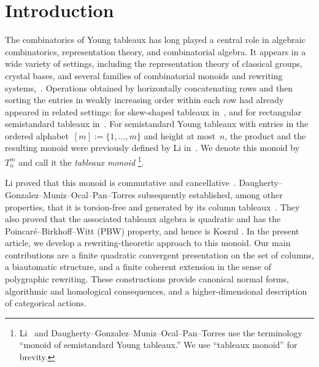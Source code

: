 \documentclass[a4paper, twoside, 11pt, english]{article}
\theoremstyle{plain}
\theoremstyle{definition}
\begin{document}
\vspace{0.5cm} 





\section{Introduction}
\label{S:Introduction}

The combinatorics of Young tableaux has long played a central role in algebraic combinatorics, representation theory, and combinatorial algebra. It appears in a wide variety of settings, including the representation theory of classical groups, crystal bases, and several families of combinatorial monoids and rewriting systems,~\cite{Fulton97,CainGrayMalheiro15,CainGrayMalheiro19,Hage25,Hage2021Super,Hage15,HageMalbos22,HageMalbos17,Hage2022RSK, Hage26}.
Operations obtained by horizontally concatenating rows and then sorting the entries in weakly increasing order within each row had already appeared in related settings: for skew-shaped tableaux in~\cite{Per2016}, and for rectangular
semistandard tableaux in~\cite{ChangDuanFraserLi20}. For semistandard Young tableaux with entries in the ordered
alphabet~$[m]:=\{1,\ldots,m\}$ and height at most~$n$, the product and the resulting monoid were previously defined by Li in~\cite[Section~3]{LiDualCanonical26}. We denote this monoid by~$T_n^m$ and call it the \emph{tableaux monoid}
\footnote{Li~\cite{LiDualCanonical26} and
Daugherty--Gonzalez--Muniz--Ocal--Pan--Torres
\cite{DaughertyGonzalezMunizOcalPanTorres25} use the terminology
``monoid of semistandard Young tableaux.'' We use ``tableaux monoid''
for brevity.}.


Li proved that this monoid is commutative and cancellative~\cite[Lemma~3.2]{LiDualCanonical26}.
Daugherty--Gonzalez--Muniz--Ocal--Pan--Torres subsequently established,
among other properties, that it is torsion-free and generated by its column
tableaux~\cite[Proposition~2.2]
{DaughertyGonzalezMunizOcalPanTorres25}.
They also proved that the associated tableaux algebra is quadratic and has
the Poincar\'e--Birkhoff--Witt (PBW) property, and hence is Koszul
\cite[Theorem~2.13, Corollary~2.14]
{DaughertyGonzalezMunizOcalPanTorres25}.
In the present article, we develop a rewriting-theoretic approach to this
monoid. Our main contributions are a finite quadratic convergent presentation
on the set of columns, a biautomatic structure, and a finite coherent
extension in the sense of polygraphic rewriting. These constructions provide
canonical normal forms, algorithmic and homological consequences, and a
higher-dimensional description of categorical actions.
\end{document}
